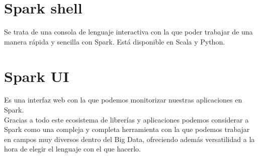 \section{Spark shell}
Se trata de una consola de lenguaje interactiva con la que poder trabajar de una manera rápida y sencilla con Spark. Está disponible en Scala y Python.\\

\section{Spark UI}
Es una interfaz web con la que podemos monitorizar nuestras aplicaciones en Spark.\\

\vspace*{3.5\baselineskip}
Gracias a todo este ecosistema de librerías y aplicaciones podemos considerar a Spark como una compleja y completa herramienta con la que podemos trabajar en campos muy diversos dentro del Big Data, ofreciendo además versatilidad a la hora de elegir el lenguaje con el que hacerlo.